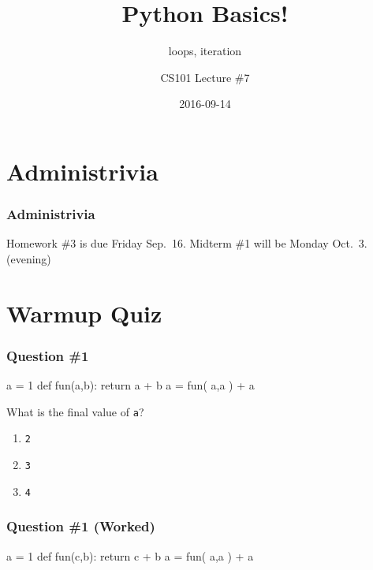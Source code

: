 \documentclass[11pt]{beamer}
\title{Python Basics!}
\subtitle{loops, iteration}
\author{CS101 Lecture \#7}
\date{2016-09-14}
\begin{document}
  \setcounter{showProgressBar}{0}
  \setcounter{showSlideNumbers}{0}

\frame{\titlepage}

\setcounter{framenumber}{0}
\setcounter{showProgressBar}{1}
\setcounter{showSlideNumbers}{1}

\section{Administrivia}

\begin{frame}
  \frametitle{Administrivia}
  \Enlarge
  \begin{itemize}
  \myitem  Homework \#3 is due Friday Sep.\ 16.
  \myitem  Midterm \#1 will be Monday Oct.\ 3.  (evening)
  \end{itemize}
\end{frame}

\section{Warmup Quiz}

\begin{frame}[fragile]
  \frametitle{Question \#1}
  \Enlarge

  \begin{semiverbatim}
a = 1
def fun(a,b):
    return a + b
a = fun( a,a ) + a
  \end{semiverbatim}
  What is the final value of \texttt{a}?
  \begin{enumerate}[label=\Alph*]
  \item  \texttt{2}
  \item  \texttt{3}
  \item  \texttt{4}
  \end{enumerate}
\end{frame}

\begin{frame}[fragile]
  \frametitle{Question \#1 (Worked)}
  \Enlarge

  \begin{semiverbatim}
a = 1
def fun(c,b):
    return c + b
a = fun( a,a ) + a
  \end{semiverbatim}
\end{frame}
\end{document}
